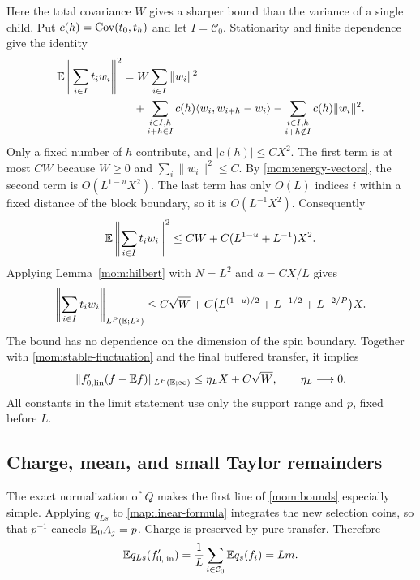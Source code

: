 Here the total covariance $W$ gives a sharper bound than the variance
of a single child.  Put $c(h)=\operatorname{Cov}(t_0,t_h)$ and let
$I=\mathcal C_0$.  Stationarity and finite dependence give the identity
\begin{align}
 \mathbb E\left\|\sum_{i\in I}t_iw_i\right\|^2
 &=W\sum_{i\in I}\|w_i\|^2\notag\\
 &\quad+\sum_{\substack{i\in I,h\\i+h\in I}}
 c(h)\langle w_i,w_{i+h}-w_i\rangle
 -\sum_{\substack{i\in I,h\\i+h\notin I}}c(h)\|w_i\|^2.
 \label{mom:covariance-regrouping}
\end{align}
Only a fixed number of $h$ contribute, and $|c(h)|\le CX^2$.
The first term is at most $CW$ because $W\ge0$ and
$\sum_i\|w_i\|^2\le C$.  By \eqref{mom:energy-vectors}, the second term
is $O(L^{1-u}X^2)$.  The last term has only $O(L)$ indices $i$ within
a fixed distance of the block boundary, so it is $O(L^{-1}X^2)$.
Consequently
\begin{equation}\label{mom:charge-variance}
 \mathbb E\left\|\sum_{i\in I}t_iw_i\right\|^2
 \le CW+C(L^{1-u}+L^{-1})X^2.
\end{equation}
Applying Lemma~\ref{mom:hilbert} with $N=L^2$ and $a=CX/L$ gives
\begin{equation}\label{mom:charge-P}
 \left\|\sum_{i\in I}t_iw_i\right\|_{L^P(\mathbb E;L^2)}
 \le C\sqrt W+
 C\bigl(L^{(1-u)/2}+L^{-1/2}+L^{-2/P}\bigr)X.
\end{equation}
The bound has no dependence on the dimension of the spin boundary.
Together with \eqref{mom:stable-fluctuation} and the final buffered
transfer, it implies
\begin{equation}\label{mom:linear-fluctuation}
 \|f'_{0,\mathrm{lin}}(f-\mathbb E f)\|_{L^P(\mathbb E;\infty)}
 \le\eta_LX+C\sqrt W,
 \qquad \eta_L\longrightarrow0.
\end{equation}
All constants in the limit statement use only the support range and
$p$, fixed before $L$.

\subsection{Charge, mean, and small Taylor remainders}

The exact normalization of $Q$ makes the first line of
\eqref{mom:bounds} especially simple.  Applying $q_{Ls}$ to
\eqref{map:linear-formula} integrates the new selection coins, so that
$p^{-1}$ cancels $\mathbb E_0A_j=p$.  Charge is preserved by pure transfer.
Therefore
\begin{equation}\label{mom:linear-charge}
 \mathbb E q_{Ls}(f'_{0,\mathrm{lin}})
 =\frac1L\sum_{i\in\mathcal C_0}\mathbb E q_s(f_i)=Lm.
\end{equation}

